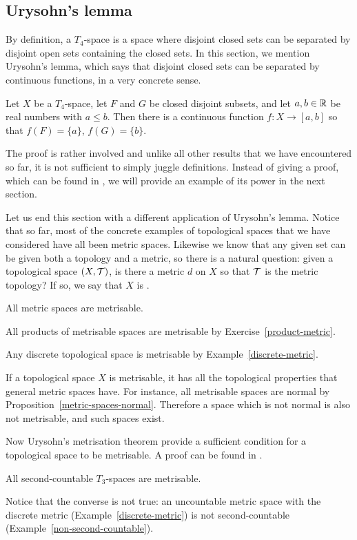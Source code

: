 \subsection{Urysohn's lemma}
By definition, a $T_4$-space is a space where disjoint closed sets can be separated by disjoint open sets containing the closed sets. In this section, we mention Urysohn's lemma, which says that disjoint closed sets can be separated by continuous functions, in a very concrete sense.
\begin{lem}
  Let $X$ be a $T_4$-space, let $F$ and $G$ be closed disjoint subsets, and let $a, b \in \mathbb{R}$ be real numbers with $a \leq b$. Then there is a continuous function $f : X \to [a,b]$ so that $f(F) = \{a\}$, $f(G) = \{b\}$.
\end{lem}
The proof is rather involved and unlike all other results that we have encountered so far, it is not sufficient to simply juggle definitions. Instead of giving a proof, which can be found in \cite[\S 33]{Mun}, we will provide an example of its power in the next section.

Let us end this section with a different application of Urysohn's lemma. Notice that so far, most of the concrete examples of topological spaces that we have considered have all been metric spaces. Likewise we know that any given set can be given both a topology and a metric, so there is a natural question: given a topological space $(X,\mathcal{T})$, is there a metric $d$ on $X$ so that $\mathcal{T}$ is the metric topology? If so, we say that $X$ is .
\begin{example}
  All metric spaces are metrisable.
\end{example}
\begin{example}
  All products of metrisable spaces are metrisable by Exercise~\ref{product-metric}.
\end{example}
\begin{example}
  Any discrete topological space is metrisable by Example~\ref{discrete-metric}.
\end{example}
If a topological space $X$ is metrisable, it has all the topological properties that general metric spaces have. For instance, all metrisable spaces are normal by Proposition~\ref{metric-spaces-normal}. Therefore a space which is not normal is also not metrisable, and such spaces exist.

Now Urysohn's metrisation theorem provide a sufficient condition for a topological space to be metrisable. A proof can be found in \cite[\S 34]{Mun}.

\begin{thm}
  All second-countable $T_3$-spaces are metrisable.
\end{thm}

Notice that the converse is not true: an uncountable metric space with the discrete metric (Example~\ref{discrete-metric}) is not second-countable (Example~\ref{non-second-countable}).
